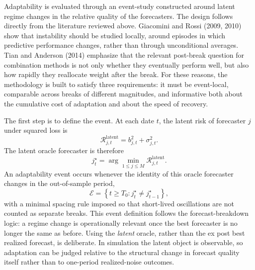 \documentclass[11pt,a4paper]{article}
\begin{document}
Adaptability is evaluated through an event-study constructed around latent regime changes in the relative quality of the forecasters. The design follows directly from the literature reviewed above. Giacomini and Rossi (2009, 2010) show that instability should be studied locally, around episodes in which predictive performance changes, rather than through unconditional averages. Tian and Anderson (2014) emphasize that the relevant post-break question for combination methods is not only whether they eventually perform well, but also how rapidly they reallocate weight after the break. For these reasons, the methodology is built to satisfy three requirements: it must be event-local, comparable across breaks of different magnitudes, and informative both about the cumulative cost of adaptation and about the speed of recovery.

The first step is to define the event. At each date $t$, the latent risk of forecaster $j$ under squared loss is
\begin{equation}
\mathcal{R}_{j,t}^{\mathrm{latent}} = b_{j,t}^2 + \sigma_{j,t}^2.
\end{equation}
The latent oracle forecaster is therefore
\begin{equation}
j_t^\star = \arg\min_{1 \leq j \leq M} \mathcal{R}_{j,t}^{\mathrm{latent}}.
\end{equation}
An adaptability event occurs whenever the identity of this oracle forecaster changes in the out-of-sample period,
\begin{equation}
\mathcal{E} = \left\{ t \geq T_0 : j_t^\star \neq j_{t-1}^\star \right\},
\end{equation}
with a minimal spacing rule imposed so that short-lived oscillations are not counted as separate breaks. This event definition follows the forecast-breakdown logic: a regime change is operationally relevant once the best forecaster is no longer the same as before. Using the \emph{latent} oracle, rather than the ex post best realized forecast, is deliberate. In simulation the latent object is observable, so adaptation can be judged relative to the structural change in forecast quality itself rather than to one-period realized-noise outcomes.
\end{document}
